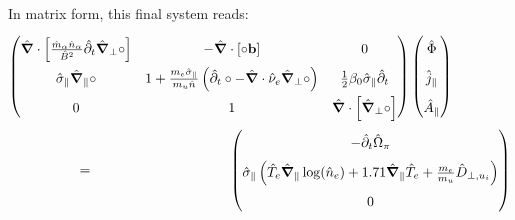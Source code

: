In matrix form, this final system reads:
\begin{align}
	\renewcommand\arraystretch{1.8}
	\begin{pmatrix}
		\hat{\grad}\cdot\left[\frac{\hat{m}_\alpha \hat{n}_\alpha}{ \hat{B}^2}\hat{\partial}_t\hat{\grad}_\perp\circ\right]  & 
		-\hat{\grad}\cdot\left[\circ\mathbf{b}\right] & 
		0 \\
		\hat{\sigma}_\parallel\hat{\grad}_\parallel\circ &
		1 + \frac{m_e\hat{\sigma}_\parallel}{m_u\hat{n}}\left(\hat{\partial}_t\circ - \hat{\grad}\cdot\hat{\nu}_e\hat{\grad}_\perp\circ\right) &
		\frac{1}{2}\beta_0\hat{\sigma}_\parallel\hat{\partial}_t \\
		0 & 1 & \hat{\grad}\cdot\left[\hat{\grad}_\perp\circ\right]
	\end{pmatrix}
	\begin{pmatrix}
		\hat{\Phi} \\ \hat{j}_\parallel \\ \hat{A}_\parallel
	\end{pmatrix}  \hspace{1.5cm}\nonumber\\ = \hspace{3.5cm}
	\begin{pmatrix}
		-\hat{\partial}_t \hat{\Omega}_\pi \\
		\hat{\sigma}_\parallel\left(\hat{T}_e\hat{\grad}_\parallel\log(\hat{n}_e) + 1.71\hat{\grad}_\parallel \hat{T}_e + \frac{m_e}{m_u}\hat{D}_{\perp,u_i}\right) \\
		0
	\end{pmatrix} \label{eq:vorticityEquation_ElectronInertiaElectromagnetism_dedimensionalized}
\end{align} 




